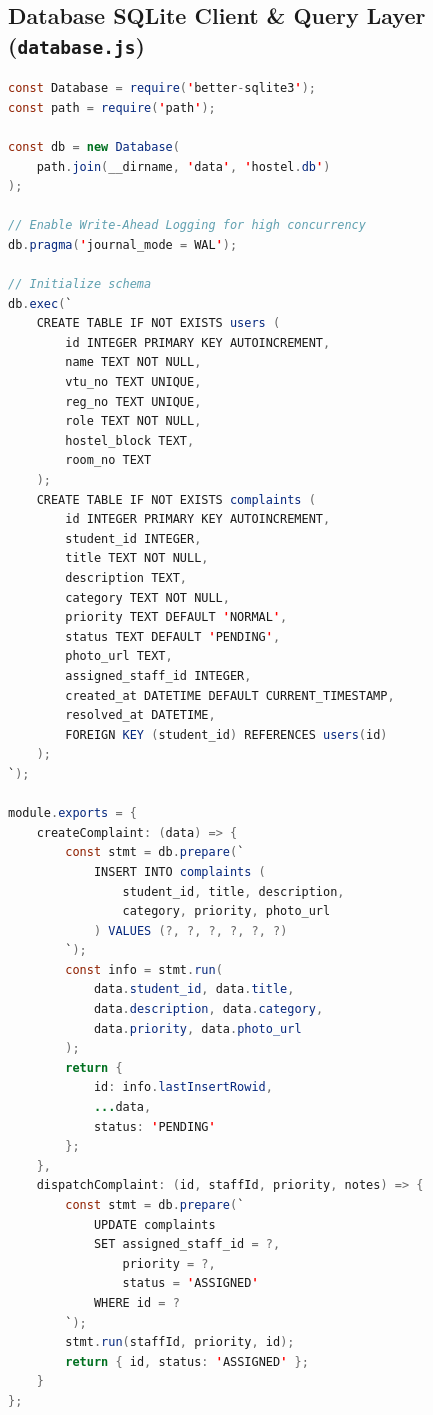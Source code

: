 \documentclass[10pt]{report}
\begin{document}
\subsection{Database SQLite Client \& Query Layer (\texttt{database.js})}
\begin{lstlisting}[language=Java, caption={SQLite Transactional Data Access Client}]
const Database = require('better-sqlite3');
const path = require('path');

const db = new Database(
    path.join(__dirname, 'data', 'hostel.db')
);

// Enable Write-Ahead Logging for high concurrency
db.pragma('journal_mode = WAL');

// Initialize schema
db.exec(`
    CREATE TABLE IF NOT EXISTS users (
        id INTEGER PRIMARY KEY AUTOINCREMENT,
        name TEXT NOT NULL,
        vtu_no TEXT UNIQUE,
        reg_no TEXT UNIQUE,
        role TEXT NOT NULL,
        hostel_block TEXT,
        room_no TEXT
    );
    CREATE TABLE IF NOT EXISTS complaints (
        id INTEGER PRIMARY KEY AUTOINCREMENT,
        student_id INTEGER,
        title TEXT NOT NULL,
        description TEXT,
        category TEXT NOT NULL,
        priority TEXT DEFAULT 'NORMAL',
        status TEXT DEFAULT 'PENDING',
        photo_url TEXT,
        assigned_staff_id INTEGER,
        created_at DATETIME DEFAULT CURRENT_TIMESTAMP,
        resolved_at DATETIME,
        FOREIGN KEY (student_id) REFERENCES users(id)
    );
`);

module.exports = {
    createComplaint: (data) => {
        const stmt = db.prepare(`
            INSERT INTO complaints (
                student_id, title, description,
                category, priority, photo_url
            ) VALUES (?, ?, ?, ?, ?, ?)
        `);
        const info = stmt.run(
            data.student_id, data.title,
            data.description, data.category,
            data.priority, data.photo_url
        );
        return {
            id: info.lastInsertRowid,
            ...data,
            status: 'PENDING'
        };
    },
    dispatchComplaint: (id, staffId, priority, notes) => {
        const stmt = db.prepare(`
            UPDATE complaints
            SET assigned_staff_id = ?,
                priority = ?,
                status = 'ASSIGNED'
            WHERE id = ?
        `);
        stmt.run(staffId, priority, id);
        return { id, status: 'ASSIGNED' };
    }
};
\end{lstlisting}

\clearpage
{}
\renewcommand\bibname{References}
\end{document}
